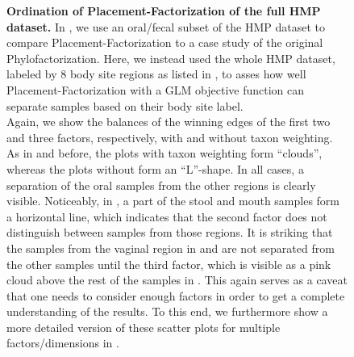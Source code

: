 \begin{figure}[!htb]
    \caption{
        \textbf{Ordination of Placement-Factorization of the full \ac{HMP} dataset.}
        In ,
        we use an oral/fecal subset of the \ac{HMP} dataset \cite{Huttenhower2012,Methe2012}
        to compare Placement-Factorization to a case study of the original Phylofactorization.
        Here, we instead used the whole \ac{HMP} dataset,
        labeled by \num{8} body site regions as listed in ,
        to asses how well Placement-Factorization with a \ac{GLM} objective function
        can separate samples based on their body site label.
        \\
        Again, we show the balances of the winning edges of the first two and three factors, respectively,
        with and without taxon weighting.
        As in  and 
        before, the plots with taxon weighting form ``clouds'', whereas the plots without form an ``L''-shape.
        In all cases, a separation of the oral samples from the other regions is clearly visible.
        Noticeably, in ,
        a part of the stool and mouth samples form a horizontal line,
        which indicates that the second factor does not distinguish between samples from those regions.
        It is striking that the samples from the vaginal region in
         and
         are not separated from the other samples
        until the third factor, which is visible as a pink cloud above the rest of the samples
        in .
        This again serves as a caveat that one needs to consider enough factors
        in order to get a complete understanding of the results.
        To this end, we furthermore show a more detailed version of these scatter plots for multiple factors/dimensions
        in .
    }
    \label{supp:fig:hmp_pf_all_ordination}
\end{figure}


